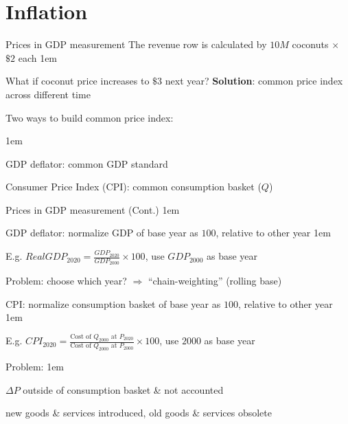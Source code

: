 \documentclass[11pt,aspectratio=43]{beamer}
\let\olditemize=\itemize
\let\endolditemize=\enditemize
\renewenvironment{itemize}{\olditemize \itemsep1em}{\endolditemize}
\let\oldenumerate=\enumerate
\let\endoldenumerate=\endenumerate
\renewenvironment{enumerate}{\oldenumerate \itemsep1em}{ \endoldenumerate}
\theoremstyle{definition}
\begin{document}
\section{Inflation}
\label{sec:Inflation}

\begin{frame}{Prices in GDP measurement}
\label{slide:Prices_in_GDP_measurement}
    The \alert{revenue} row is calculated by $ 10M $ coconuts $ \times $ $ \$2 $ each
    \begin{itemize}
        \item What if coconut price increases to $ \$3 $ next year?
    \end{itemize}
    \textbf{Solution}: common \alert{price index} across different time

    Two ways to build common price index:

    \begin{enumerate}
        \item GDP deflator: common \alert{GDP} standard
        \item Consumer Price Index (CPI): common \alert{consumption basket} ($Q$)
    \end{enumerate}
\end{frame}

\begin{frame}{Prices in GDP measurement (Cont.)}
\label{slide:Prices_in_GDP_measurement__Cont__}
    \begin{itemize}
        \item GDP deflator: normalize \alert{GDP} of \alert{base year} as $ 100 $, relative to \alert{other year}
        \begin{itemize}
            \item E.g. $ RealGDP_{2020} = \frac{GDP_{2020}}{GDP_{2000}} \times 100 $, use $ GDP_{2000} $ as base year
            \item \alert{Problem}: choose which year? $ \Rightarrow  $ ``\alert{chain-weighting}'' (rolling base)
        \end{itemize}
        \item CPI: normalize \alert{consumption basket} of \alert{base year} as $ 100 $, relative to \alert{other year}
        \begin{itemize}
            \item E.g. $ CPI_{2020} = \frac{\text{Cost of } Q_{2000} \text{ at } P_{2020}}{\text{Cost of } Q_{2000} \text{ at } P_{2000}} \times 100 $, use $ 2000 $ as base year
            \item \alert{Problem}:
            \begin{enumerate}
                \item $ \Delta P $ outside of consumption basket \&  not accounted
                \item new goods \& services introduced, old goods \& services obsolete
            \end{enumerate}
        \end{itemize}
    \end{itemize}
\end{frame}
\end{document}
